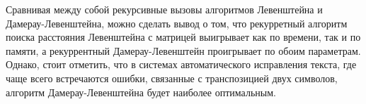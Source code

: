 Сравнивая между собой рекурсивные вызовы алгоритмов Левенштейна и Дамерау-Левенштейна, можно сделать вывод о том, что рекурретный алгоритм поиска расстояния Левенштейна с матрицей выигрывает как по времени, так и по памяти, а рекуррентный Дамерау-Левенштейн проигрывает по обоим параметрам. Однако, стоит отметить, что в системах автоматического исправления текста, где чаще всего встречаются ошибки, связанные с транспозицией двух символов, алгоритм Дамерау-Левенштейна будет наиболее оптимальным.\\